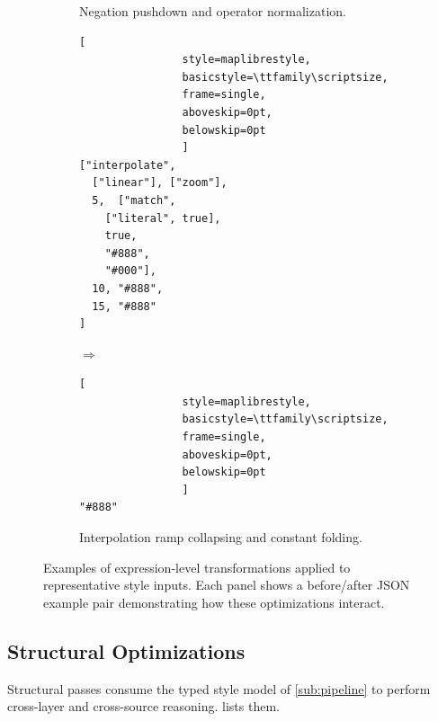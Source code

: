 \begin{figure}[ht]
\begin{subfigure}[t]{\linewidth}
		\caption{
Negation pushdown and operator normalization.}
		\label{fig:expr_d}
	\end{subfigure}

	\vspace{4mm}

	\begin{subfigure}[t]{\linewidth}
		\centering

		\begin{minipage}[c]{0.45\linewidth}
			\centering
			\begin{lstlisting}[
				style=maplibrestyle,
				basicstyle=\ttfamily\scriptsize,
				frame=single,
				aboveskip=0pt,
				belowskip=0pt
				]
["interpolate",
  ["linear"], ["zoom"],
  5,  ["match",
    ["literal", true],
    true,
    "#888",
    "#000"],
  10, "#888",
  15, "#888"
]\end{lstlisting}
		\end{minipage}
		\hfill
		\begin{minipage}[c]{0.08\linewidth}
			\centering
			\vfill
			{\Huge$\Longrightarrow$}
			\vfill
		\end{minipage}
		\hfill
		\begin{minipage}[c]{0.45\linewidth}
			\centering
			\begin{lstlisting}[
				style=maplibrestyle,
				basicstyle=\ttfamily\scriptsize,
				frame=single,
				aboveskip=0pt,
				belowskip=0pt
				]
"#888"\end{lstlisting}
		\end{minipage}

		\caption{
Interpolation ramp collapsing and constant folding.}
		\label{fig:expr_e}
	\end{subfigure}

	\caption{
Examples of expression-level transformations applied to representative style inputs.
Each panel shows a before/after \ac{JSON} example pair demonstrating how these optimizations interact.}
	\label{fig:expr_before_after}
\end{figure}

\clearpage
\subsection{Structural Optimizations}\label{sub:structural_optimizations}

Structural passes consume the typed style model of \cref{sub:pipeline} to perform cross-layer and cross-source reasoning.
 lists them.

